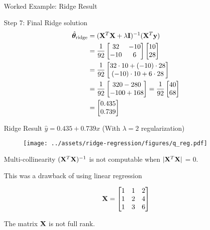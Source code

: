 \documentclass{beamer}
\begin{document}
\begin{frame}{Worked Example: Ridge Result}
\begin{codebox}{Step 7: Final Ridge solution}
\begin{align*}
\hat{\boldsymbol{\theta}}_{\text{ridge}} &= (\mathbf{X}^{T}\mathbf{X} + \lambda\mathbf{I})^{-1}(\mathbf{X}^{T}\mathbf{y}) \\
&= \frac{1}{92} \begin{bmatrix} 32 & -10 \\ -10 & 6 \end{bmatrix} \begin{bmatrix} 10 \\ 28 \end{bmatrix} \\
&= \frac{1}{92} \begin{bmatrix} 32 \cdot 10 + (-10) \cdot 28 \\ (-10) \cdot 10 + 6 \cdot 28 \end{bmatrix} \\
&= \frac{1}{92} \begin{bmatrix} 320 - 280 \\ -100 + 168 \end{bmatrix} = \frac{1}{92} \begin{bmatrix} 40 \\ 68 \end{bmatrix} \\
&= \begin{bmatrix} 0.435 \\ 0.739 \end{bmatrix}
\end{align*}
\end{codebox}
\pause

\begin{theorembox}{Ridge Result}
$\hat{y} = 0.435 + 0.739x$ \quad (With $\lambda = 2$ regularization)
\end{theorembox}

\begin{figure}
\texttt{[image: ../assets/ridge-regression/figures/q\_reg.pdf]}
\end{figure}
\end{frame}

\begin{frame}{Multi-collinearity}
$(\mathbf{X}^{T}\mathbf{X})^{-1}$ is not computable when $|\mathbf{X}^{T}\mathbf{X}|$ = 0.

This was a drawback of using linear regression

\begin{equation*}
\mathbf{X} = \begin{bmatrix}
1 & 1& 2\\
1 & 2& 4\\
1 & 3& 6\\
\end{bmatrix}
\end{equation*}

The matrix $\mathbf{X}$ is not full rank. 
\end{frame}
\end{document}
